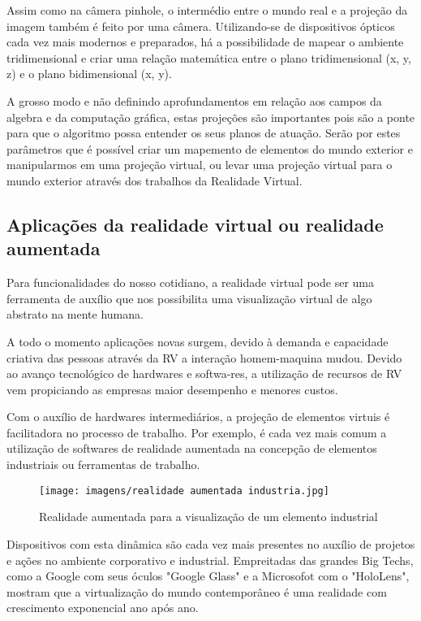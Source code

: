 \documentclass[a4paper, 10pt]{article}
\begin{document}
Assim como na câmera pinhole, o intermédio entre o mundo real e a projeção da imagem também é feito por uma câmera. Utilizando-se de dispositivos ópticos cada vez mais modernos e preparados, há a possibilidade de mapear o ambiente tridimensional e criar uma relação matemática entre o plano tridimensional (x, y, z) e o plano bidimensional (x, y). 

A grosso modo e não definindo aprofundamentos em relação aos campos da algebra e da computação gráfica, estas projeções são importantes pois são a ponte para que o algoritmo possa entender os seus planos de atuação. Serão por estes parâmetros que é possível criar um mapemento de elementos do mundo exterior e manipularmos em uma projeção virtual, ou levar uma projeção virtual para o mundo exterior através dos trabalhos da Realidade Virtual.

\subsection{Aplicações da realidade virtual ou realidade aumentada}
Para funcionalidades do nosso cotidiano, a realidade virtual pode ser uma ferramenta de auxílio que nos possibilita uma visualização virtual de algo abstrato na mente humana.

\begin{adjustwidth}{0.4\textwidth}{}
A todo  o  momento  aplicações  novas  surgem,  devido  à  demanda e capacidade  criativa  das  pessoas  através  da  RV  a  interação homem-maquina  mudou.  Devido ao avanço tecnológico de hardwares e softwa-res, a utilização de recursos de RV vem propiciando as empresas maior desempenho e menores custos. \citep{rodrigues2013}
\end{adjustwidth}

Com o auxílio de hardwares intermediários, a projeção de elementos virtuis é facilitadora no processo de trabalho. Por exemplo, é cada vez mais comum a utilização de softwares de realidade aumentada na concepção de elementos industriais ou ferramentas de trabalho.

\begin{figure}[H]
    \centering
    \texttt{[image: imagens/realidade aumentada industria.jpg]}
    \caption{Realidade aumentada para a visualização de um elemento industrial}
    \label{fig:my_label}
    \citep{industry}
\end{figure}

Dispositivos com esta dinâmica são cada vez mais presentes no auxílio de projetos e ações no ambiente corporativo e industrial. Empreitadas das grandes Big Techs, como a Google com seus óculos "Google Glass" e a Microsofot com o "HoloLens", mostram que a virtualização do mundo contemporâneo é uma realidade com crescimento exponencial ano após ano. 
\end{document}

